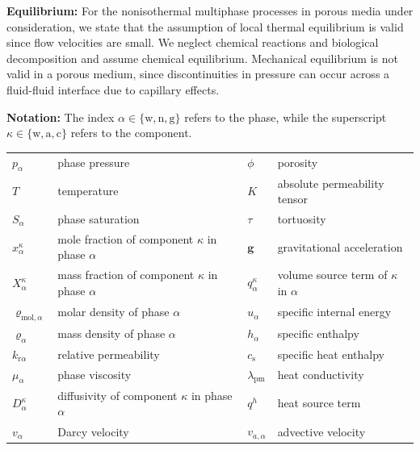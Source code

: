 \textbf{Equilibrium:}
For the nonisothermal multiphase processes in porous media under
consideration, we state that the assumption of local thermal
equilibrium is valid since flow velocities are small. We neglect
chemical reactions and biological decomposition and assume chemical
equilibrium.  Mechanical equilibrium is not valid in a porous medium, 
since discontinuities in pressure can occur across a fluid-fluid
interface due to capillary effects.

\textbf{Notation:} The index $\alpha \in \{\text{w}, \text{n}, \text{g}\}$ refers 
to the phase, while the superscript $\kappa \in \{\text{w}, \text{a}, \text{c}\}$ refers 
to the component. \\
\begin{tabular}{llll}
$p_\alpha$ & phase pressure & $\phi$ & porosity \\
$T$ & temperature & $K$ & absolute permeability tensor \\
$S_\alpha$ & phase saturation & $\tau$ & tortuosity \\
$x_\alpha^\kappa$ & mole fraction of component $\kappa$ in phase $\alpha$ & $\boldsymbol{g}$ & gravitational acceleration \\
$X_\alpha^\kappa$ & mass fraction of component $\kappa$ in phase $\alpha$ & $q^\kappa_\alpha$ & volume source term of $\kappa$ in $\alpha$ \\
$\varrho_{\text{mol},\alpha}$ & molar density of phase $\alpha$ & $u_\alpha$ & specific internal energy \\
$\varrho_{\alpha}$ & mass density of phase $\alpha$ & $h_\alpha$ & specific enthalpy \\
$k_{\text{r}\alpha}$ & relative permeability & $c_\text{s}$ & specific heat enthalpy \\
$\mu_\alpha$ & phase viscosity & $\lambda_\text{pm}$ & heat conductivity \\
$D_\alpha^\kappa$ & diffusivity of component $\kappa$ in phase $\alpha$ & $q^h$ & heat source term \\
$v_\alpha$ & Darcy velocity & $v_{a,\alpha}$  & advective velocity
\end{tabular}


